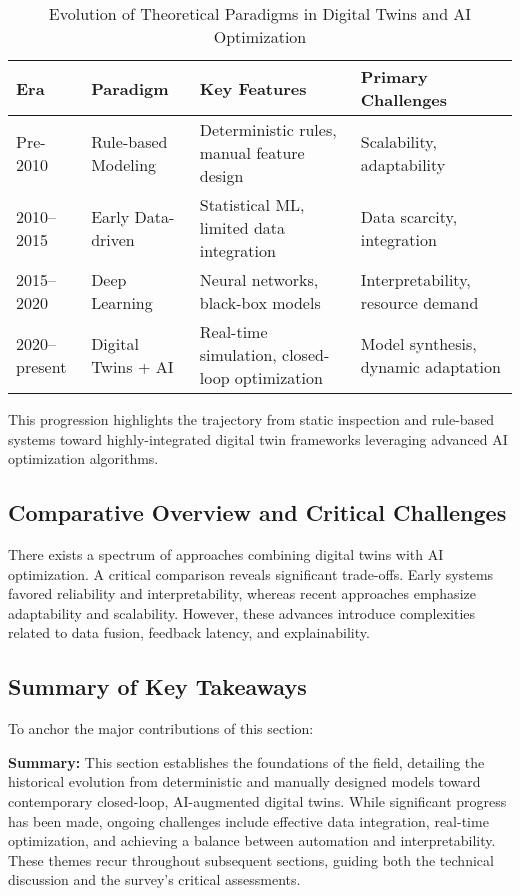 \documentclass[sigconf]{acmart}
\begin{document}
\begin{table*}[htbp]
\centering
\caption{Evolution of Theoretical Paradigms in Digital Twins and AI Optimization}
\label{tab:paradigm-evolution}
\begin{adjustbox}{max width=\textwidth}
\begin{tabular}{@{}llll@{}}
\toprule
Era & Paradigm         & Key Features                                   & Primary Challenges \\
\midrule
Pre-2010      & Rule-based Modeling   & Deterministic rules, manual feature design      & Scalability, adaptability      \\
2010--2015    & Early Data-driven     & Statistical ML, limited data integration       & Data scarcity, integration    \\
2015--2020    & Deep Learning         & Neural networks, black-box models              & Interpretability, resource demand \\
2020--present & Digital Twins + AI    & Real-time simulation, closed-loop optimization & Model synthesis, dynamic adaptation \\
\bottomrule
\end{tabular}
\end{adjustbox}
\end{table*}

This progression highlights the trajectory from static inspection and rule-based systems toward highly-integrated digital twin frameworks leveraging advanced AI optimization algorithms.

\subsection{Comparative Overview and Critical Challenges}
There exists a spectrum of approaches combining digital twins with AI optimization. A critical comparison reveals significant trade-offs. Early systems favored reliability and interpretability, whereas recent approaches emphasize adaptability and scalability. However, these advances introduce complexities related to data fusion, feedback latency, and explainability.

\subsection{Summary of Key Takeaways}
To anchor the major contributions of this section:

\textbf{Summary:} 
This section establishes the foundations of the field, detailing the historical evolution from deterministic and manually designed models toward contemporary closed-loop, AI-augmented digital twins. While significant progress has been made, ongoing challenges include effective data integration, real-time optimization, and achieving a balance between automation and interpretability. These themes recur throughout subsequent sections, guiding both the technical discussion and the survey's critical assessments.
\end{document}

